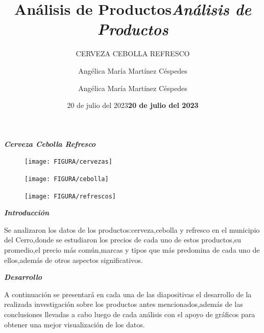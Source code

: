 \documentclass[10pt]{beamer}
\title{Análisis de Productos}
\author{Angélica María Martínez Céspedes}
\date{20 de julio del 2023}
\title{{\Huge \textbf{\textit{Análisis de Productos}}}}
\author{Angélica María Martínez Céspedes}
\date{\textbf{20 de julio del 2023}}
\subtitle{CERVEZA CEBOLLA REFRESCO}
\institute{\textbf{{\scriptsize Facultad de Matemática y Computación}}}
\begin{document}
   	\begin{frame}
   		\titlepage
   	\end{frame}
   	
   
   	
  
   	\begin{frame}
   		
   		\begin{center}
   			{\LARGE{\textbf{\textit{Cerveza  Cebolla  Refresco}}}}
   		\end{center}
   		
   		\begin{figure}
   			\centering
   			\texttt{[image: FIGURA/cervezas]}
   			\caption{}
   			\label{fig:cervezas}
   		\end{figure}
   		
   	
   	   \begin{figure}
   	   	\centering
   	   	\texttt{[image: FIGURA/cebolla]}
   	   	\caption{}
   	   	\label{fig:cebolla}
   	   \end{figure}
   	   
   	
   	  
   	  \begin{figure}
   	  	\centering
   	  	\texttt{[image: FIGURA/refrescos]}
   	  	\caption{}
   	  	\label{fig:refrescos}
   	  \end{figure}
   	  
   	   
   	\end{frame}
   	
   	 	
   	\begin{frame}{\textbf{\textit{Introducción}}}
   	 \begin{center}
   			Se analizaron los datos de los productos:cerveza,cebolla y refresco en el municipio del Cerro,donde se estudiaron los precios de cada uno de estos productos,su promedio,el precio más común,marcas y tipos que más predomina de cada uno de ellos,además de otros aspectos significativos.
   	 \end{center}
   	\end{frame}
   	
   	\begin{frame}{\textbf{\textit{Desarrollo}}}
   		
   		A continuación se presentará en cada una de las diapositivas el desarrollo de la realizada investigación sobre los productos antes mencionados,además de las conclusiones llevadas a cabo luego de cada análisis con el apoyo de gráficos para obtener una mejor visualización de los datos. 
   	
   	       
   	
   	\end{frame}	
   		
\end{document}
